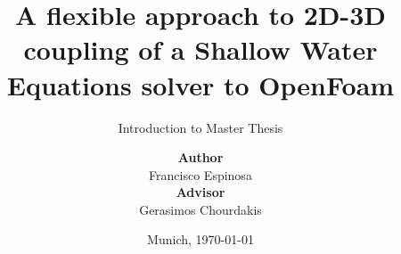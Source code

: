 %
% 
% 
%
\newcommand{\shiftedframetitle}[1]{\frametitle{\\\vspace{-2cm}#1}\vspace{0.5cm}}





\newcommand{\Datum}{\today}

\renewcommand{\PraesentationFusszeileZusatz}{| Introduction to Master Thesis}

\title{A flexible approach to 2D-3D coupling of a Shallow Water Equations solver to OpenFoam}
\subtitle{Introduction to Master Thesis}
\author{\vspace{0.5cm}\textbf{Author}\\ Francisco Espinosa \\[0.2cm] \textbf{Advisor} \\ Gerasimos Chourdakis}
\date[\Datum]{Munich, \Datum}
\subject{Introduction to Master Thesis}




